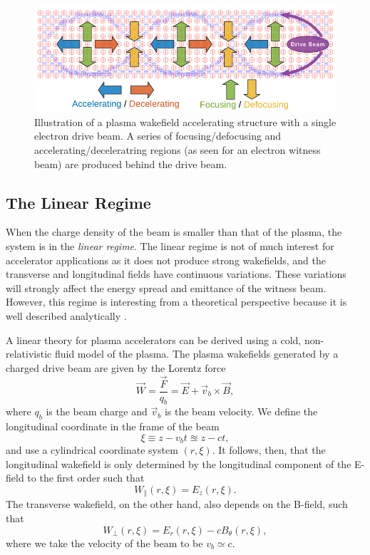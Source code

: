 \begin{figure}[hbt]
    \centering
    \includegraphics[width=0.85\linewidth,trim={0mm 0mm 0mm 0mm},clip]{figures/PlasmaWakefield}
    \caption{\label{Fig:PWFA:Illust} Illustration of a plasma wakefield accelerating structure with a single electron drive beam. A series of focusing/defocusing and accelerating/deceleratring regions (as seen for an electron witness beam) are produced behind the drive beam.}
\end{figure}

\subsection{The Linear Regime}
\label{Int:BPI:Lin}

When the charge density of the beam is smaller than that of the plasma, the system is in the \textit{linear regime}. The linear regime is not of much interest for accelerator applications as it does not produce strong wakefields, and the transverse and longitudinal fields have continuous variations. These variations will strongly affect the energy spread and emittance of the witness beam. However, this regime is interesting from a theoretical perspective because it is well described analytically \cite{muggli:2017}.

A linear theory for plasma accelerators can be derived using a cold, non-relativistic fluid model of the plasma. The plasma wakefields generated by a charged drive beam are given by the Lorentz force
\begin{equation}
    \vec{W} = \frac{\vec{F}}{q_{b}} = \vec{E} + \vec{v}_{b} \times \vec{B}, \label{EQ:Lorentz}
\end{equation}
where $q_{b}$ is the beam charge and $\vec{v}_{b}$ is the beam velocity. We define the longitudinal coordinate in the frame of the beam
\begin{equation}
    \xi \equiv z - v_{b}t \approxeq z - ct, \label{EQ:Xi}
\end{equation}
and use a cylindrical coordinate system $(r, \xi)$. It follows, then, that the longitudinal wakefield is only determined by the longitudinal component of the E-field \dash to the first order \dash such that
\begin{equation}
    W_{\parallel}(r,\xi) = E_{z}(r,\xi). \label{EQ:Wz}
\end{equation}
The transverse wakefield, on the other hand, also depends on the B-field, such that
\begin{equation}
    W_{\perp}(r,\xi) = E_{r}(r,\xi) - cB_{\theta}(r,\xi), \label{EQ:Wr}
\end{equation}
where we take the velocity of the beam to be $v_{b} \simeq c$.

